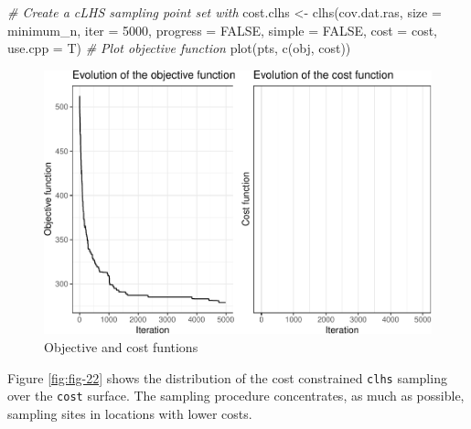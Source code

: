 \documentclass[
  10pt,
  b5paper,
  oneside]{book}
\newenvironment{Shaded}{\begin{snugshade}}{\end{snugshade}}
\newcommand{\AttributeTok}[1]{\textcolor[rgb]{0.77,0.63,0.00}{#1}}
\newcommand{\CommentTok}[1]{\textcolor[rgb]{0.56,0.35,0.01}{\textit{#1}}}
\newcommand{\ConstantTok}[1]{\textcolor[rgb]{0.00,0.00,0.00}{#1}}
\newcommand{\DecValTok}[1]{\textcolor[rgb]{0.00,0.00,0.81}{#1}}
\newcommand{\FunctionTok}[1]{\textcolor[rgb]{0.00,0.00,0.00}{#1}}
\newcommand{\NormalTok}[1]{#1}
\newcommand{\OtherTok}[1]{\textcolor[rgb]{0.56,0.35,0.01}{#1}}
\newcommand{\SpecialCharTok}[1]{\textcolor[rgb]{0.00,0.00,0.00}{#1}}
\newcommand{\StringTok}[1]{\textcolor[rgb]{0.31,0.60,0.02}{#1}}
\begin{document}
\begin{Shaded}
\begin{Highlighting}[]
  \CommentTok{\# Create a cLHS sampling point set with }
\NormalTok{  cost.clhs }\OtherTok{\textless{}{-}} \FunctionTok{clhs}\NormalTok{(cov.dat.ras, }\AttributeTok{size =}\NormalTok{ minimum\_n, }\AttributeTok{iter =} \DecValTok{5000}\NormalTok{, }\AttributeTok{progress =} \ConstantTok{FALSE}\NormalTok{, }\AttributeTok{simple =} \ConstantTok{FALSE}\NormalTok{, }\AttributeTok{cost =} \StringTok{\textquotesingle{}cost\textquotesingle{}}\NormalTok{,  }\AttributeTok{use.cpp =}\NormalTok{ T)}
  \CommentTok{\# Plot objective function}
  \FunctionTok{plot}\NormalTok{(pts, }\FunctionTok{c}\NormalTok{(}\StringTok{\textquotesingle{}obj\textquotesingle{}}\NormalTok{, }\StringTok{\textquotesingle{}cost\textquotesingle{}}\NormalTok{))}
\end{Highlighting}
\end{Shaded}

\begin{figure}
\centering
\includegraphics{Technical-Manual-Soil-Sampling-Design_files/figure-latex/fig-21-1.pdf}
\caption{\label{fig:fig-21}Objective and cost funtions}
\end{figure}

Figure \ref{fig:fig-22} shows the distribution of the cost constrained \texttt{\textquotesingle{}clhs\textquotesingle{}} sampling over the \texttt{\textquotesingle{}cost\textquotesingle{}} surface. The sampling procedure concentrates, as much as possible, sampling sites in locations with lower costs.

\begin{Shaded}
\end{Shaded}
\end{document}
